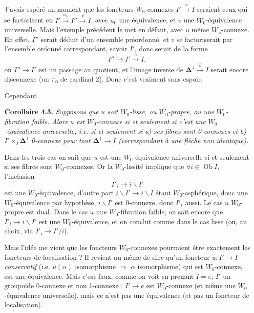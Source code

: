\documentclass[11pt]{article}
\newcommand{\msp}[1]{\marginpar{\footnotesize [#1]}}
\newcommand{\Ob}{\operatorname{Ob}}
\newcommand{\bDelta}{\boldsymbol{\Delta}}
\begin{document}
J'avais espéré un moment que les foncteurs $W_0$-connexes $I' \xrightarrow{u} I$ seraient ceux qui se factorisent en $I' \xrightarrow{u_0} I'' \xrightarrow{v} I$, avec $u_0$ une équivalence, et $v$ une $W_0$-équivalence universelle. Mais l'exemple précédent le met en défaut, avec $u$ même $W_\omega$-connexe. En effet, $I''$ serait déduit d'un ensemble préordonné, et $v$ se factoriserait par l'ensemble ordonné correspondant, savoir $I'$, donc serait de la forme
\[
I'' \longrightarrow I' \xrightarrow{u} I,
\]
où $I'' \longrightarrow I'$ est un passage au quotient, et l'image inverse de $\bDelta^1 \xrightarrow{\partial} I$ serait encore disconnexe (un $\pi_0$ de cardinal 2). Donc c'est vraiment sans espoir.

Cependant

\textbf{Corollaire 4.3.} \textit{Supposons que $u$ soit $W_0$-lisse, ou $W_0$-propre, ou une $W_0$-fibration faible. Alors $u$ est $W_0$-connexe si et seulement si c'est une $W_0$-équivalence universelle, i.e. si et seulement si a) ses fibres sont \textup{0}-connexes et b) $I' \times_I \bDelta^1$} \textit{\textup{0}-connexe pour tout $\bDelta^1 \longrightarrow I$ (correspondant à une flèche non identique).}

\msp{page 59}Dans les trois cas on sait que $u$ est une $W_0$-équivalence universelle si et seulement si ses fibres sont $W_0$-connexes. Or la $W_0$-lissité implique que $\forall i \in \Ob I$, l'inclusion
\[
I'_i \longrightarrow i\backslash I'
\]
est une $W_0$-équivalence, d'autre part $i\backslash I' \longrightarrow i\backslash I$ étant $W_0$-asphérique, donc une $W_0$-équivalence par hypothèse, $i\backslash I'$ est 0-connexe, donc $I'_i$ aussi. Le cas $u$ $W_0$-propre est dual. Dans le cas $u$ une $W_0$-fibration faible, on sait encore que $I'_i \longrightarrow i\backslash I'$ est une $W_0$-équivalence, et on conclut comme dans le cas lisse (ou, au choix, via $I'_i \longrightarrow I'/i$).

Mais l'idée me vient que les foncteurs $W_0$-connexes pourraient être exactement les foncteurs de localisation ? Il revient au même de dire qu'un foncteur $u : I' \longrightarrow I$ \textit{conservatif} (i.e. $u(\alpha)$ isomorphisme $\Longrightarrow$ $\alpha$ isomorphisme) qui est $W_0$-connexe, est une équivalence. Mais c'est faux, comme on voit en prenant $I = e$, $I'$ un groupoïde 0-connexe et non 1-connexe : $I' \longrightarrow e$ est $W_0$-connexe (et même une $W_0$-équivalence universelle), mais ce n'est pas une équivalence (et pas un foncteur de localisation).
\end{document}
